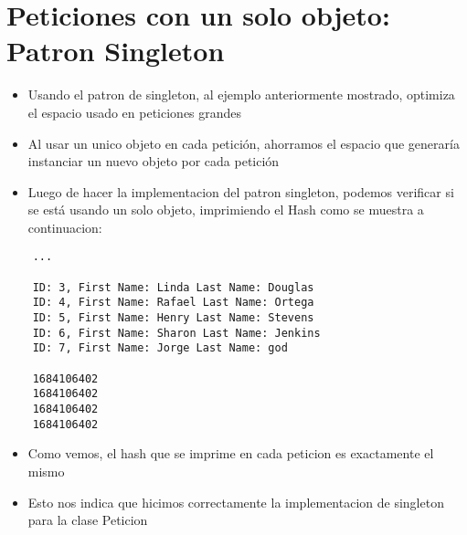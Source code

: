 \section{Peticiones con un solo objeto: Patron Singleton}
\begin{itemize}
  \item Usando el patron de singleton, al ejemplo anteriormente mostrado, optimiza el espacio usado en peticiones grandes
  \item Al usar un unico objeto en cada petición, ahorramos el espacio que generaría instanciar un nuevo objeto por cada petición
  \item Luego de hacer la implementacion del patron singleton, podemos verificar si se está usando un solo objeto, imprimiendo el Hash como se muestra a continuacion:
\end{itemize}

\begin{lstlisting}
    ...

    ID: 3, First Name: Linda Last Name: Douglas
    ID: 4, First Name: Rafael Last Name: Ortega
    ID: 5, First Name: Henry Last Name: Stevens
    ID: 6, First Name: Sharon Last Name: Jenkins
    ID: 7, First Name: Jorge Last Name: god

    1684106402
    1684106402
    1684106402
    1684106402  
\end{lstlisting}

\begin{itemize}
  \item Como vemos, el hash que se imprime en cada peticion es exactamente el mismo
  \item Esto nos indica que hicimos correctamente la implementacion de singleton para la clase Peticion
\end{itemize}
